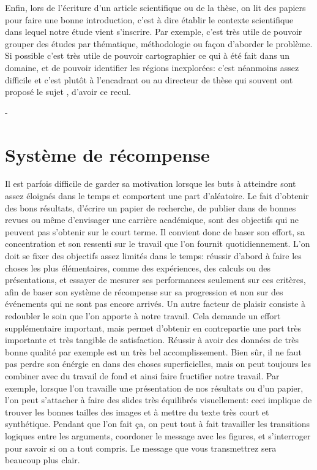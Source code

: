 \documentclass[24pt]{article}
\begin{document}
Enfin, lors de l'écriture d'un article scientifique ou de la thèse, on lit des papiers pour faire une bonne introduction, c'est à dire établir le contexte scientifique dans lequel notre étude vient s'inscrire. Par exemple, c'est très utile de pouvoir grouper des études par thématique, méthodologie ou façon d'aborder le problème. Si possible c'est très utile de pouvoir cartographier ce qui à été fait dans un domaine, et de pouvoir identifier les régions inexplorées: c'est néanmoins assez difficile et c'est plutôt à l'encadrant ou au directeur de thèse qui souvent ont proposé le sujet  , d'avoir ce recul.


- 

\section{Système de récompense}

Il est parfois difficile de garder sa motivation lorsque les buts à atteindre sont assez éloignés dans le temps et comportent une part d'aléatoire. Le fait d'obtenir des bons résultats, d'écrire un papier de recherche, de publier dans de bonnes revues ou même d'envisager une carrière académique, sont des objectifs qui ne peuvent pas s'obtenir sur le court terme. Il convient donc de baser son effort, sa concentration et son ressenti  sur le travail que l'on fournit quotidiennement. L'on doit se fixer des objectifs assez limités dans le temps: réussir d'abord à faire les choses les plus élémentaires, comme des expériences, des calculs ou des présentations, et essayer de mesurer ses performances seulement sur ces critères, afin de baser son système de récompense sur sa  progression et non sur des événements qui ne sont pas encore arrivés.  
Un autre facteur de plaisir consiste à redoubler le soin que l'on apporte à notre travail. Cela demande un effort supplémentaire important, mais permet d'obtenir en contrepartie une part très importante et très tangible de satisfaction. Réussir à avoir des données de très bonne qualité par exemple est un très bel accomplissement. Bien sûr, il ne faut pas perdre son énérgie en dans des choses superficielles, mais on peut toujours les combiner avec du travail de fond et ainsi faire fructifier notre travail. Par exemple, lorsque l'on travaille une présentation de nos résultats ou d'un papier, l'on peut s'attacher à faire des slides très 
équilibrés visuellement:  ceci implique de trouver les bonnes tailles des images et à mettre du texte très court et synthétique. Pendant que l'on fait ça, on peut tout à fait travailler les transitions logiques entre les arguments, coordoner le message avec les figures, et s'interroger pour savoir si on a tout compris. Le message que vous transmettrez sera beaucoup plus clair.
\end{document}

